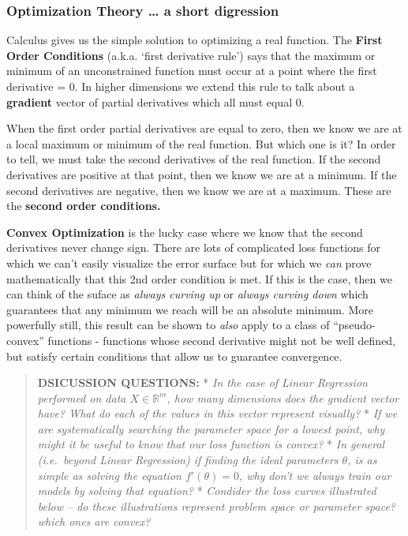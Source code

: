 \documentclass[11pt]{article}
\begin{document}
    \hypertarget{optimization-theory-a-short-digression}{%
\subsubsection{Optimization Theory \ldots{} a short
digression}\label{optimization-theory-a-short-digression}}

Calculus gives us the simple solution to optimizing a real function. The
\textbf{First Order Conditions} (a.k.a. `first derivative rule') says
that the maximum or minimum of an unconstrained function must occur at a
point where the first derivative = 0. In higher dimensions we extend
this rule to talk about a \textbf{gradient} vector of partial
derivatives which all must equal 0.

When the first order partial derivatives are equal to zero, then we know
we are at a local maximum or minimum of the real function. But which one
is it? In order to tell, we must take the second derivatives of the real
function. If the second derivatives are positive at that point, then we
know we are at a minimum. If the second derivatives are negative, then
we know we are at a maximum. These are the \textbf{second order
conditions.}

\textbf{Convex Optimization} is the lucky case where we know that the
second derivatives never change sign. There are lots of complicated loss
functions for which we can't easily visualize the error surface but for
which we \emph{can} prove mathematically that this 2nd order condition
is met. If this is the case, then we can think of the suface as
\emph{always curving up} or \emph{always curving down} which guarantees
that any minimum we reach will be an absolute minimum. More powerfully
still, this result can be shown to \emph{also} apply to a class of
``pseudo-convex'' functions - functions whose second derivative might
not be well defined, but satisfy certain conditions that allow us to
guarantee convergence.

    \begin{quote}
\textbf{DSICUSSION QUESTIONS:} * \emph{In the case of Linear Regression
performed on data \(X \in \mathbb{R}^m\), how many dimensions does the
gradient vector have? What do each of the values in this vector
represent visually?} * \emph{If we are systematically searching the
parameter space for a lowest point, why might it be useful to know that
our loss function is convex?} * \emph{In general (i.e.~beyond Linear
Regression) if finding the ideal parameters \(\theta\), is as simple as
solving the equation \(f'(\theta)=0\), why don't we always train our
models by solving that equation?} * \emph{Condider the loss curves
illustrated below -- do these illustrations represent problem space or
parameter space? which ones are convex?}
\end{quote}
\end{document}
